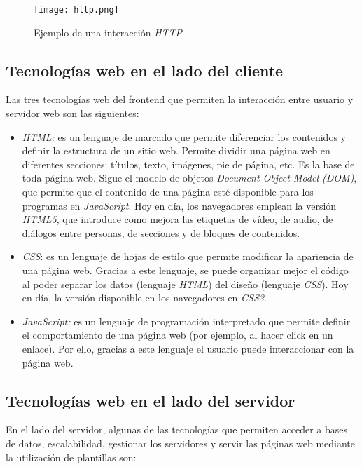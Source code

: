 \begin{figure}[h!]
    \centering
    \texttt{[image: http.png]}
    \caption[Ejemplo de una interacción \textit{HTTP}]{Ejemplo de una interacción \textit{HTTP}\footnotemark} 
    \label{fig:http}
\end{figure}

\clearpage
\subsection{Tecnologías web en el lado del cliente}
Las tres tecnologías web del frontend que permiten la interacción entre usuario y servidor web son las siguientes:
\begin{itemize}
    \item \textit{HTML:} es un lenguaje de marcado que permite diferenciar los contenidos y definir la estructura de un sitio web. Permite dividir una página web en diferentes secciones: títulos, texto, imágenes, pie de página, etc. Es la base de toda página web. Sigue el modelo de objetos \textit{Document Object Model (DOM)}, que permite que el contenido de una página esté disponible para los programas en \textit{JavaScript}. Hoy en día, los navegadores emplean la versión \textit{HTML5}, que introduce como mejora las etiquetas de vídeo, de audio, de diálogos entre personas, de secciones y de bloques de contenidos.
    \item \textit{CSS}: es un lenguaje de hojas de estilo que permite modificar la apariencia de una página web. Gracias a este lenguaje, se puede organizar mejor el código al poder separar los datos (lenguaje \textit{HTML}) del diseño (lenguaje \textit{CSS}). Hoy en día, la versión disponible en los navegadores en \textit{CSS3}.
    \item \textit{JavaScript:} es un lenguaje de programación interpretado que permite definir el comportamiento de una página web (por ejemplo, al hacer click en un enlace). Por ello, gracias a este lenguaje el usuario puede interaccionar con la página web.
\end{itemize}

\subsection{Tecnologías web en el lado del servidor}
En el lado del servidor, algunas de las tecnologías que permiten acceder a bases de datos, escalabilidad, gestionar los servidores y servir las páginas web mediante la utilización de plantillas son:

